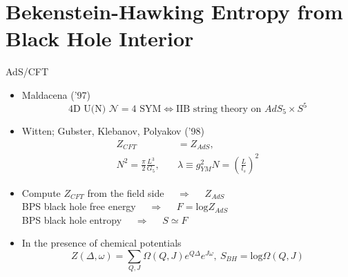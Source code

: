 \documentclass{beamer}
\begin{document}
\section{Bekenstein-Hawking Entropy from Black Hole Interior}
    \begin{frame}{AdS/CFT}
    \begin{itemize}
        \item Maldacena{\color{blue} ('97)}
        \begin{equation*}
            \text{4D U(N) $\mathcal{N}=4$ SYM}\iff \text{IIB string theory on } AdS_5\times S^5
        \end{equation*}
    \item  Witten; Gubster, Klebanov, Polyakov {\color{blue}('98)}
    \begin{equation*}
    \begin{split}
        Z_{CFT}&=Z_{AdS},\\
        N^2=\frac{\pi}{2}\frac{L^3}{G_5},\quad &\lambda\equiv g^2_{YM}N=\left(\frac{L}{l_s}\right)^2
    \end{split}
    \end{equation*}
    \item Compute $Z_{CFT}$ from the field side   $\quad\Rightarrow\quad$   $Z_{AdS}$\\
    BPS black hole free energy   $\quad\Rightarrow\quad$   $F=\mathrm{log}Z_{AdS}$\\
    BPS black hole entropy   $\quad\Rightarrow\quad$   $S\simeq F$
    \item In the presence of chemical potentials
    \begin{equation*}
        Z(\Delta,\omega)=\sum_{Q,J}\Omega(Q,J)e^{Q\Delta}e^{J\omega},\  S_{BH}=\mathrm{log}\Omega(Q,J)
    \end{equation*}
    \end{itemize}
\end{frame}
\end{document}
